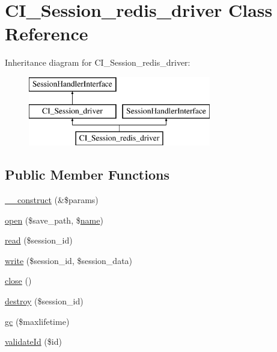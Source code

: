 \hypertarget{class_c_i___session__redis__driver}{}\section{C\+I\+\_\+\+Session\+\_\+redis\+\_\+driver Class Reference}
\label{class_c_i___session__redis__driver}
Inheritance diagram for C\+I\+\_\+\+Session\+\_\+redis\+\_\+driver\+:\begin{figure}[H]
\begin{center}
\leavevmode
\includegraphics[height=3.000000cm]{class_c_i___session__redis__driver}
\end{center}
\end{figure}
\subsection*{Public Member Functions}
\begin{DoxyCompactItemize}
\item 
\mbox{\hyperlink{class_c_i___session__redis__driver_ac1669c73d53d6f16cf5459a1e84d39c8}{\+\_\+\+\_\+construct}} (\&\$params)
\item 
\mbox{\hyperlink{class_c_i___session__redis__driver_a614b5cf3840833913c7a73260ed28e02}{open}} (\$save\+\_\+path, \$\mbox{\hyperlink{waiter_2order_8php_afb270cde4944e425a37cf277116a7f43}{name}})
\item 
\mbox{\hyperlink{class_c_i___session__redis__driver_a5bbf84ebf657be4eaccc0582377c76bf}{read}} (\$session\+\_\+id)
\item 
\mbox{\hyperlink{class_c_i___session__redis__driver_ad9d124885be93668f1dbf6aace5964f5}{write}} (\$session\+\_\+id, \$session\+\_\+data)
\item 
\mbox{\hyperlink{class_c_i___session__redis__driver_aa69c8bf1f1dcf4e72552efff1fe3e87e}{close}} ()
\item 
\mbox{\hyperlink{class_c_i___session__redis__driver_aaec5812f6b4eb6835f88d3baa06a002a}{destroy}} (\$session\+\_\+id)
\item 
\mbox{\hyperlink{class_c_i___session__redis__driver_a57aff7ee0656d8aa75d545fb8b3ae35d}{gc}} (\$maxlifetime)
\item 
\mbox{\hyperlink{class_c_i___session__redis__driver_a4a58e8f59b2accc199bbebd5ee52bc74}{validate\+Id}} (\$id)
\end{DoxyCompactItemize}
